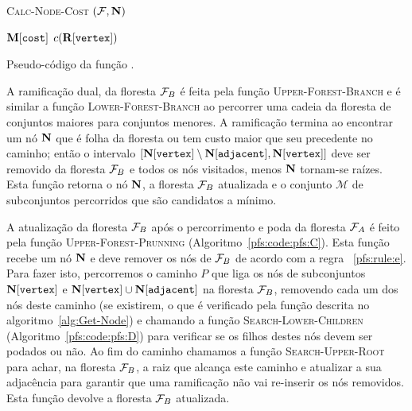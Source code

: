 \begin{algorithm}[H]
\textsc{Calc-Node-Cost} $(\mathcal{F}, \mathbf N)$
\begin{algorithmic}[1]
    \Return $\mathbf M[\texttt{cost}]$
\Else
    \Return $c(\mathbf R[\texttt{vertex}])$
\EndIf
\end{algorithmic}
\caption{Pseudo-código da função .}
\label{alg:Calc-Node-Cost}
\end{algorithm}

A ramificação dual, da floresta $\mathcal{F}_B$ é feita pela função 
\textsc{Upper-Forest-Branch} e é similar a função 
\textsc{Lower-Forest-Branch} ao percorrer uma cadeia da floresta de 
conjuntos maiores para conjuntos menores. A ramificação termina ao 
encontrar um nó $\mathbf N$ que é folha da floresta ou tem custo maior
que seu precedente no caminho; então o intervalo 
$[\mathbf N[\texttt{vertex}] \setminus \mathbf N[\texttt{adjacent}], \mathbf N[\texttt{vertex}]]$
deve ser removido da floresta $\mathcal{F}_B$ e todos os nós visitados, 
menos $\mathbf N$ tornam-se raízes. Esta função retorna o nó
$\mathbf N$, a floresta $\mathcal{F}_B$ atualizada e o conjunto 
$\mathcal{M}$ de subconjuntos percorridos que são candidatos a mínimo.

A atualização da floresta $\mathcal{F}_B$ após o percorrimento e poda da
floresta $\mathcal{F}_A$ é feito pela função \textsc{Upper-Forest-Prunning} (Algoritmo~\ref{pfs:code:pfs:C}).
Esta função recebe um nó $\mathbf N$ e deve remover os nós de 
$\mathcal{F}_B$ de acordo com a regra ~\ref{pfs:rule:e}. Para fazer isto, 
percorremos o caminho $P$ que liga os nós de subconjuntos 
$\mathbf N[\texttt{vertex}]$ e $\mathbf N[\texttt{vertex}] \cup 
\mathbf N[\texttt{adjacent}]$ na floresta $\mathcal{F}_B$, removendo cada
um dos nós deste caminho (se existirem, o que é verificado pela função descrita no algoritmo~\ref{alg:Get-Node}) e chamando a função 
\textsc{Search-Lower-Children} (Algoritmo~\ref{pfs:code:pfs:D}) para verificar se os filhos destes nós
devem ser podados ou não. Ao fim do caminho chamamos a função 
\textsc{Search-Upper-Root} para achar, na floresta $\mathcal{F}_B$, a raiz
que alcança este caminho e atualizar a sua adjacência  para garantir que 
uma ramificação não vai re-inserir os nós removidos. 
Esta função devolve a floresta $\mathcal{F}_B$ atualizada.

